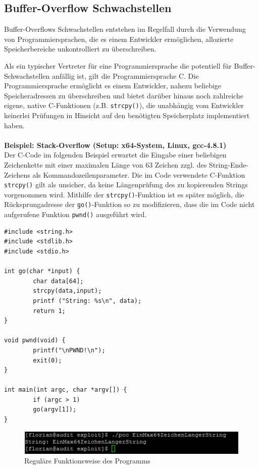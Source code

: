\subsection{Buffer-Overflow Schwachstellen}	

Buffer-Overflows Schwachstellen entstehen im Regelfall durch die 
Verwendung von Programmiersprachen, die es einem Entwickler ermöglichen, 
allozierte Speicherbereiche unkontrolliert zu überschreiben.

\par\medskip 
Als ein typischer Vertreter für eine Programmiersprache die potentiell 
für Buffer-Schwachstellen anfällig ist, gilt die Programmiersprache C. 
Die Programmiersprache ermöglicht es einem Entwickler, nahezu beliebige 
Speicheradressen zu überschreiben und bietet darüber hinaus noch 
zahlreiche eigene, native C-Funktionen (z.B. \texttt{strcpy()}), die 
unabhängig vom Entwickler keinerlei Prüfungen in Hinsicht auf den 
benötigten Speicherplatz implementiert haben.
\\\\
\textbf{Beispiel: Stack-Overflow (Setup: x64-System, Linux, gcc-4.8.1)}
\\
Der C-Code im folgenden Beispiel erwartet die Eingabe einer beliebigen 
Zeichenkette mit einer maximalen Länge von 63 Zeichen zzgl. 
des String-Ende-Zeichens als Kommandozeilenparameter. 
Die im Code verwendete C-Funktion \texttt{strcpy()} gilt als unsicher, 
da keine Längenprüfung des zu kopierenden Strings vorgenommen wird. 
Mithilfe der \texttt{strcpy()}-Funktion ist es später möglich, die 
Rücksprungadresse der \texttt{go()}-Funktion so zu modifizieren, dass 
die im Code nicht aufgerufene Funktion \texttt{pwnd()} ausgeführt wird.

\begin{lstlisting}[basicstyle=\ttfamily\footnotesize]
#include <string.h>
#include <stdlib.h>
#include <stdio.h>

int go(char *input) {
        char data[64];
        strcpy(data,input);
        printf ("String: %s\n", data);
        return 1;
}

void pwnd(void) {
        printf("\nPWND!\n");
        exit(0);
}

int main(int argc, char *argv[]) {
        if (argc > 1)
        go(argv[1]);
}
\end{lstlisting}

\begin{figure}[htbp]
 \centering
 \includegraphics[scale=.5]{abbildungen/poc_1}
 \caption{Reguläre Funktionsweise des Programms}
 \label{fig:poc_1} 
\end{figure}

